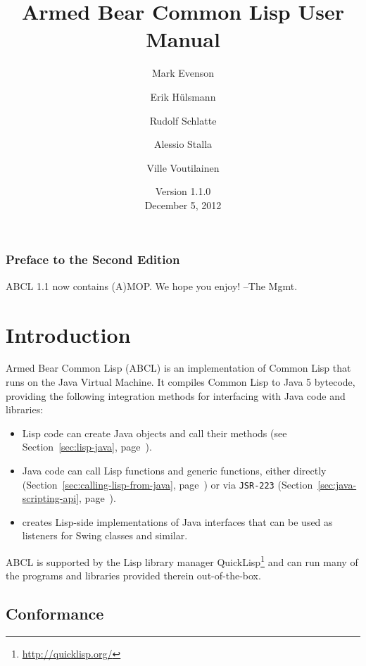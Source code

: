 \documentclass[10pt]{book}
\begin{document}
\title{Armed Bear Common Lisp User Manual}
\date{Version 1.1.0\\
\smallskip
December 5, 2012}
\author{Mark Evenson \and Erik H\"{u}lsmann \and Rudolf Schlatte \and
  Alessio Stalla \and Ville Voutilainen}

\maketitle

\tableofcontents


\subsection{Preface to the Second Edition}

ABCL 1.1 now contains (A)MOP.  We hope you enjoy!  --The Mgmt.

\chapter{Introduction}

Armed Bear Common Lisp (ABCL) is an implementation of Common Lisp that
runs on the Java Virtual Machine.  It compiles Common Lisp to Java 5
bytecode, providing the following integration methods for interfacing
with Java code and libraries:
\begin{itemize}
\item Lisp code can create Java objects and call their methods (see
  Section~\ref{sec:lisp-java}, page~\pageref{sec:lisp-java}).
\item Java code can call Lisp functions and generic functions, either
  directly (Section~\ref{sec:calling-lisp-from-java},
  page~\pageref{sec:calling-lisp-from-java}) or via \texttt{JSR-223}
  (Section~\ref{sec:java-scripting-api},
  page~\pageref{sec:java-scripting-api}).
\item {} creates Lisp-side implementations
  of Java interfaces that can be used as listeners for Swing classes and
  similar.
\end{itemize}
ABCL is supported by the Lisp library manager
QuickLisp\footnote{\url{http://quicklisp.org/}} and can run many of the
programs and libraries provided therein out-of-the-box.

\section{Conformance}
\label{section:conformance}
\end{document}
